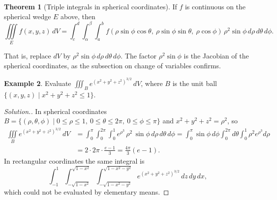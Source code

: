 \documentclass[11pt,a4paper]{article}
\theoremstyle{definition}
\newtheorem{thm}{Theorem}[subsection]
\newtheorem{exa}[thm]{Example}
\newenvironment{solution}
  {\renewcommand{\qedsymbol}{}\begin{proof}[\textit{Solution}.]}
  {\end{proof}}
\begin{document}
\begin{thm}[Triple integrals in spherical coordinates]
\label{thm:spherical}
If $f$ is continuous on the spherical wedge $E$ above, then
\[\iiint\limits_E f(x,y,z)\,dV = \int^d_c\int^{\beta}_{\alpha} \int^b_a f(\rho
\sin \phi \cos \theta,\ \rho \sin \phi \sin \theta,\ \rho \cos \phi)\,\rho^2\sin
\phi\, d\rho\, d\theta\, d\phi .\]
\end{thm}

That is, replace $dV$ by $\rho^2\sin\phi\,d\rho\,d\theta\,d\phi$. The factor
$\rho^2\sin\phi$ is the Jacobian of the spherical coordinates, as the
subsection on change of variables confirms.

\begin{exa}
\label{ex:ballexp}
Evaluate $\iiint_B e^{(x^2 + y^2 +z^2)^{3/2}}\,dV$, where $B$ is the unit ball
$\{(x,y,z) \mid x^2 + y^2 + z^2 \leq 1\}$.
\end{exa}

\begin{solution}
In spherical coordinates $B = \{(\rho,\theta,\phi) \mid 0\leq \rho \leq 1,\ 0
\leq \theta \leq 2\pi,\ 0\leq \phi \leq \pi\}$ and $x^2 + y^2 + z^2 = \rho^2$,
so
\begin{align*}
\iiint\limits_B e^{(x^2+y^2+z^2)^{3/2}}\, dV & = \int^{\pi}_0 \int^{2\pi}_0
\int^1_0 e^{\rho^3}\, \rho^2 \, \sin \phi \, d\rho \, d\theta \, d\phi =
\int^{\pi}_0\sin \phi\,d\phi \int^{2\pi}_0d\theta \int^1_0\rho^2
e^{\rho^3}d\rho\\
& = 2\cdot 2\pi\cdot \frac{e - 1}{3} = \frac{4\pi}{3}(e -1) .
\end{align*}
In rectangular coordinates the same integral is
\[\int^1_{-1}\int^{\sqrt{1-x^2}}_{-\sqrt{1-x^2}}\int^{\sqrt{1-x^2
-y^2}}_{-\sqrt{1 - x^2 - y^2}}e^{(x^2+y^2+z^2)^{3/2}} \,dz\,dy\,dx ,\]
which could not be evaluated by elementary means.
\end{solution}
\end{document}
